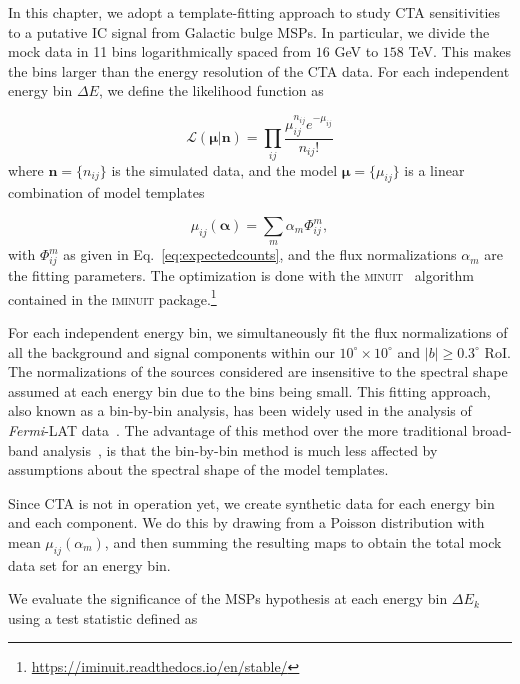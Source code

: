 \documentclass[doublespace,nopageskip]{VTthesis} %
\begin{document}
In this chapter, we adopt a template-fitting approach to study CTA sensitivities to a putative IC signal from Galactic bulge MSPs. In particular, we divide the mock data in 11 bins logarithmically spaced from $16$ GeV to $158$ TeV. This makes the bins larger than the energy resolution of the CTA data. 
For each independent energy bin $\Delta E$, we define the likelihood function as   

\begin{equation}\label{eq:likelihoodfunc}
   \mathcal{L}(\boldsymbol{\mu}\lvert \boldsymbol{n}) = \prod_{ij}\frac{\mu_{ij}^{n_{ij}} e^{-\mu_{ij}}}{n_{ij}!}
\end{equation}
where $\boldsymbol{n}=\{n_{ij}\}$ is the simulated data, and the model $\boldsymbol{\mu}=\{\mu_{ij}\}$ is a linear combination of model templates

\begin{equation}\label{eq:superposition}
    \mu_{ij}(\boldsymbol{\alpha}) = \sum_{m} \alpha_{m} \Phi^m_{ij}, 
\end{equation}
with $\Phi^m_{ij}$ as given in Eq.~\ref{eq:expectedcounts}, and the flux normalizations $\alpha_m$ are the fitting parameters. The optimization is done with the \textsc{minuit}~\citep{Nelder:1965zz} algorithm contained in the \textsc{iminuit} package.\footnote{\url{https://iminuit.readthedocs.io/en/stable/}} 

For each independent energy bin, we simultaneously fit the flux normalizations of all the background and signal components within our $10^\circ \times 10^\circ$ and $|b|\geq 0.3^\circ$ RoI. The normalizations of the sources considered are insensitive to the spectral shape assumed at each energy bin due to the bins being small.  This fitting approach, also known as a bin-by-bin analysis, has been widely used in the analysis of \textit{Fermi}-LAT data~\cite[e.g.,][]{2015PhRvL.115w1301A}. The advantage of this method over the more traditional broad-band analysis~\citep[e.g.,][]{2021PhRvD.103b3011R,2021JCAP...01..057A}, is that the bin-by-bin method is much less affected by assumptions about the spectral shape of the model templates. 

Since CTA is not in operation yet, we create synthetic data for each energy bin and each component. We do this by drawing from a Poisson distribution with mean $\mu_{ij}(\alpha_m)$, and then summing the resulting maps to obtain the total mock data set for an energy bin.

We evaluate the significance of the MSPs hypothesis at each energy bin $\Delta E_k$ using a test statistic defined as
\end{document}
